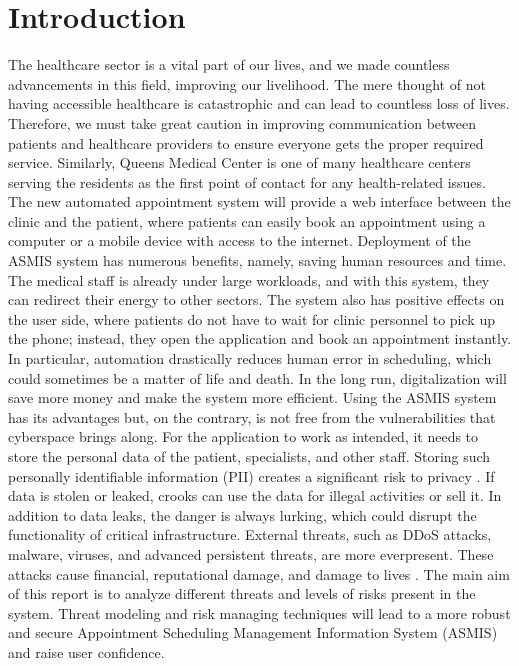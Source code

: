 \chapter{Introduction}
The healthcare sector is a vital part of our lives, and we made countless advancements in this field, improving our livelihood. The mere thought of not having accessible healthcare is catastrophic and can lead to countless loss of lives. Therefore, we must take great caution in improving communication between patients and healthcare providers to ensure everyone gets the proper required service.\newline \newline
Similarly, Queens Medical Center is one of many healthcare centers serving the 
residents as the first point of contact for any health-related issues. The new automated appointment system will provide a web interface between the clinic and the patient, where patients can easily book an appointment using a computer or a mobile device with access to the internet.\newline\newline
Deployment of the ASMIS system has numerous benefits, namely, saving human resources and time. The medical staff is already under large workloads, and with this system, they can redirect their energy to other sectors. The system also has positive effects on the user side, where patients do not have to wait for clinic personnel to pick up the phone; instead, they open the application and book an appointment instantly. In particular, automation drastically reduces human error in scheduling, which could sometimes be a matter of life and death. In the long run, digitalization will save more money and make the system more efficient.\newline\newline
Using the ASMIS system has its advantages but, on the contrary, is not free from the vulnerabilities that cyberspace brings along. For the application to work as intended, it needs to store the personal data of the patient, specialists, and other staff. Storing such personally identifiable information (PII) creates a significant risk to privacy \citep[p.~374]{IOT}. If data is stolen or leaked, crooks can use the data for illegal activities or sell it. In addition to data leaks, the danger is always lurking, which could disrupt the functionality of critical infrastructure. External threats, such as DDoS attacks, malware, viruses, and advanced persistent threats, are more everpresent. These attacks cause financial, reputational damage, and damage to lives \citep[p.~377]{IOT}.\newline\newline
The main aim of this report is to analyze different threats and levels of risks present in the system. Threat modeling and risk managing techniques will lead to a more robust and secure Appointment Scheduling Management Information System (ASMIS) and raise user confidence.